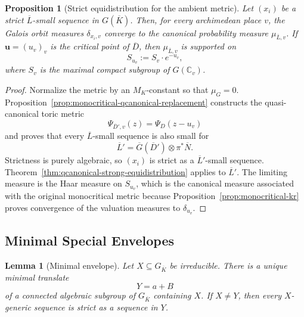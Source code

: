 \documentclass[10pt,a4paper]{amsart}
\theoremstyle{plain}
\newtheorem{lemma}[theorem]{Lemma}
\newtheorem{proposition}[theorem]{Proposition}
\theoremstyle{plain}
\numberwithin{equation}{section}
\providecommand{\bD}{\overline{D}}
\providecommand{\bL}{\overline{L}}
\providecommand{\bN}{\overline{N}}
\begin{document}
\begin{proposition}[Strict equidistribution for the ambient metric]
	Let \((x_i)\) be a strict \(\bL\)-small
	sequence in \(G(\overline{K})\).  Then, for every archimedean place \(v\), the Galois
	orbit measures \(\delta_{x_i,v}\) converge to the canonical probability
	measure \(\mu_{\bL,v}\).  If \(\mathbf u=(u_v)_v\) is the critical point of
	\(\bD\), then \(\mu_{\bL,v}\) is supported on
	\[
	S_{u_v}:=S_v\cdot e^{-u_v},
	\]
	where \(S_v\) is the maximal compact subgroup of \(G(\mathbb C_v)\).
\end{proposition}

\begin{proof}
	Normalize the metric by an \(M_K\)-constant so that \(\mu_G=0\).
	Proposition~\ref{prop:monocritical-qcanonical-replacement}
	constructs the quasi-canonical toric metric
	\[
	\Psi_{\bD',v}(z)=\Psi_D(z-u_v)
	\]
	and proves that every \(\bL\)-small sequence is also small for
	\[
	\bL'=\overline G(\bD')\otimes\pi^*\bN.
	\]
	Strictness is purely algebraic, so \((x_i)\) is strict as a \(\bL'\)-small
	sequence.  Theorem~\ref{thm:qcanonical-strong-equidistribution} applies to
	\(\bL'\).  The limiting measure is
	the Haar measure on \(S_{u_v}\), which is the canonical measure associated with
	the original monocritical metric because
	Proposition~\ref{prop:monocritical-kr} proves convergence of the valuation
	measures to \(\delta_{u_v}\).
\end{proof}

\subsection{Minimal Special Envelopes}

\begin{lemma}[Minimal envelope]\label{lem:minimal-envelope}
	Let \(X\subseteq G_{\overline{K}}\) be irreducible.  There is a unique minimal translate
	\[
	Y=a+B
	\]
	of a connected algebraic subgroup of \(G_{\overline{K}}\) containing \(X\).  If
	\(X\neq Y\), then every \(X\)-generic sequence is strict as a sequence in
	\(Y\).
\end{lemma}
\end{document}
